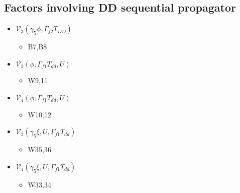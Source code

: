 \documentclass{article}[12pt]
\begin{document}
\subsection{Factors involving DD sequential propagator}
\begin{itemize}
\item ${\mathcal V}_3\left(\gamma_5\phi, \Gamma_{f2} T_{DD}\right)$
\begin{itemize}
\item B7,B8
\end{itemize}
\item ${\mathcal V}_2\left(\phi, \Gamma_{f1}T_{dd},  U\right)$
\begin{itemize}
\item W9,11
\end{itemize}
\item ${\mathcal V}_4\left(\phi, \Gamma_{f1}T_{dd},  U\right)$
\begin{itemize}
\item W10,12
\end{itemize}
\item ${\mathcal V}_2\left(\gamma_5\xi, U, \Gamma_{f1}T_{dd}\right)$
\begin{itemize}
\item W35,36
\end{itemize}
\item ${\mathcal V}_4\left(\gamma_5\xi, U, \Gamma_{f1}T_{dd}\right)$
\begin{itemize}
\item W33,34
\end{itemize}
\end{itemize}
\end{document}
